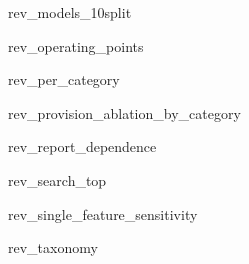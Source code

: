 \documentclass[preprint,12pt]{elsarticle}
\begin{document}
\clearpage
\begin{table}[p]\centering\caption{rev\_models\_10split}
\begin{adjustbox}{max width=\textwidth}

\end{adjustbox}
\end{table}
\clearpage
\begin{table}[p]\centering\caption{rev\_operating\_points}
\begin{adjustbox}{max width=\textwidth}

\end{adjustbox}
\end{table}
\clearpage
\begin{table}[p]\centering\caption{rev\_per\_category}
\begin{adjustbox}{max width=\textwidth}

\end{adjustbox}
\end{table}
\clearpage
\begin{table}[p]\centering\caption{rev\_provision\_ablation\_by\_category}
\begin{adjustbox}{max width=\textwidth}

\end{adjustbox}
\end{table}
\clearpage
\begin{table}[p]\centering\caption{rev\_report\_dependence}
\begin{adjustbox}{max width=\textwidth}

\end{adjustbox}
\end{table}
\clearpage
\begin{table}[p]\centering\caption{rev\_search\_top}
\begin{adjustbox}{max width=\textwidth}

\end{adjustbox}
\end{table}
\clearpage
\begin{table}[p]\centering\caption{rev\_single\_feature\_sensitivity}
\begin{adjustbox}{max width=\textwidth}

\end{adjustbox}
\end{table}
\clearpage
\begin{table}[p]\centering\caption{rev\_taxonomy}
\begin{adjustbox}{max width=\textwidth}

\end{adjustbox}
\end{table}
\end{document}
